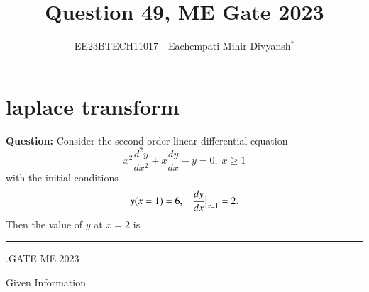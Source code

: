 \documentclass[journal,12pt,twocolumn]{IEEEtran}
\theoremstyle{remark}
\begin{document}

\vspace{3cm}

\title{Question 49, ME Gate 2023}
\author{EE23BTECH11017 - Eachempati Mihir Divyansh$^{*}$}
\chapter{laplace transform}
\maketitle
\newpage
\bigskip

\renewcommand{\thefigure}{\theenumi}
\renewcommand{\thetable}{\theenumi}

\textbf{Question:} Consider the second-order linear differential equation
\[x^2\frac{d^2y}{dx^2}+x\frac{dy}{dx}-y=0, \; x\geq 1\]
with the initial conditions $$y(x=1)=6,\; \;\; \frac{dy}{dx}\big{|}_{x=1}=2.$$
Then the value of $y$ at $x=2$ is \rule{2cm}{0.1mm}.{\hfill{GATE ME 2023}}\\

\solution
\fi
\begin{table}[h!]
    \centering
    
    \caption{Given Information} \label{gateME49.tab:1}
\end{table}
\end{document}
